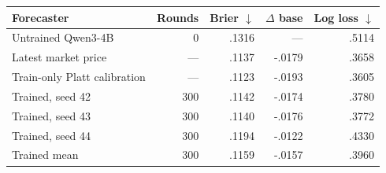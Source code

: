 \begin{tabular}{lrrrr}
\toprule
Forecaster & Rounds & Brier $\downarrow$ & $\Delta$ base & Log loss $\downarrow$ \\
\midrule
Untrained Qwen3-4B & 0   & .1316 & ---    & .5114 \\
Latest market price & --- & .1137 & -.0179 & .3658 \\
Train-only Platt calibration & --- & .1123 & -.0193 & .3605 \\
\midrule
Trained, seed 42 & 300 & .1142 & -.0174 & .3780 \\
Trained, seed 43 & 300 & .1140 & -.0176 & .3772 \\
Trained, seed 44 & 300 & .1194 & -.0122 & .4330 \\
\midrule
Trained mean     & 300 & .1159 & -.0157 & .3960 \\
\bottomrule
\end{tabular}
